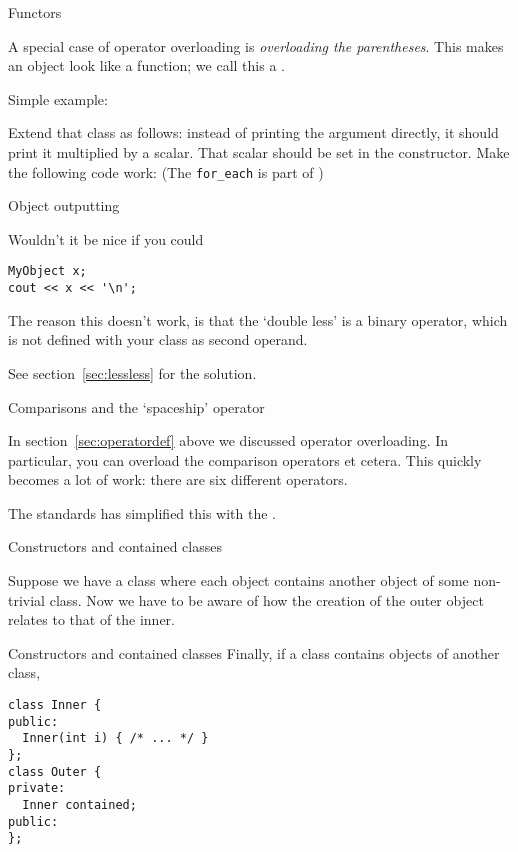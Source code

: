  {Functors}
\label{sec:functor}

A special case of operator overloading is
%
\emph{overloading the parentheses}. This makes an object look like a
function; we call this a .

Simple example:
%

\begin{exercise}
  \label{ex:functor2}
  Extend that class as follows: instead of printing the argument
  directly, it should print it multiplied by a scalar. That scalar
  should be set in the constructor. Make the following code work:
  (The \lstinline{for_each} is part of )
\end{exercise}


 {Object outputting}
\label{sec:cout-object}

Wouldn't it be nice if you could
\begin{lstlisting}
MyObject x;
cout << x << '\n';
\end{lstlisting}
The reason this doesn't work, is that the `double less'
is a binary operator, which is not defined
with your class as second operand.

See section~\ref{sec:lessless} for the solution.

 {Comparisons and the `spaceship' operator}

In section~\ref{sec:operatordef} above we discussed operator overloading.
In particular, you can overload the comparison operators \n{<,=,>} et cetera.
This quickly becomes a lot of work: there are six different operators.

The  standards has simplified this with
the .


 {Constructors and contained classes}

Suppose we have a class where each object contains
another object of some non-trivial class.
Now we have to be aware of how the creation of the
outer object relates to that of the inner.

\begin{block}{Constructors and contained classes}
  \label{sl:construct-contained1}
  Finally, if a class contains objects of another class,
  \lstset{style=snippetcode}
\begin{lstlisting}
class Inner {
public:
  Inner(int i) { /* ... */ }
};
class Outer {
private:
  Inner contained;
public:
};
\end{lstlisting}
\end{block}

